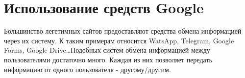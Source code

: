\section{Использование средств Google}



Большинство легетимных сайтов предоставляют средства обмена информацией через их систему. К таким примерам относится WatsApp, Telegram, Google Forms, Google Drive\dots Подобных систем обмена информацией между пользователями достаточно много. Каждая из них позволяет передать информацию от одного пользователя - другому/другим. 

